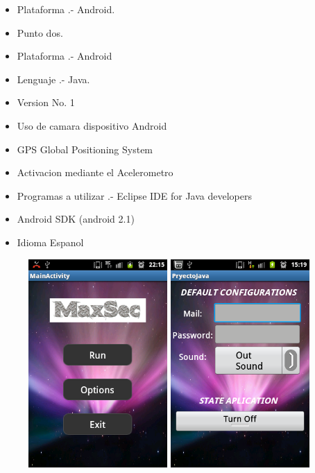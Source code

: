 \documentclass[12pt,letterpaper]{article}
\begin{document}
   \begin{itemize}
   
   \item Plataforma .- Android.
   \item Punto dos.
   \item Plataforma .- Android
   \item Lenguaje .- Java.
   \item Version No. 1
   \item Uso de camara dispositivo Android
   \item GPS Global Positioning System
   \item Activacion mediante el Acelerometro
   \item Programas a utilizar .- Eclipse IDE for Java developers
   \item Android SDK (android 2.1)
   \item Idioma{\tiny } Espanol
   
   
   \end{itemize}

\begin{figure}[h]
\includegraphics[width=150pt]{max1.png}\hspace{2cm}
\includegraphics[width=150pt]{max2.png}
\end{figure}
\end{document}
